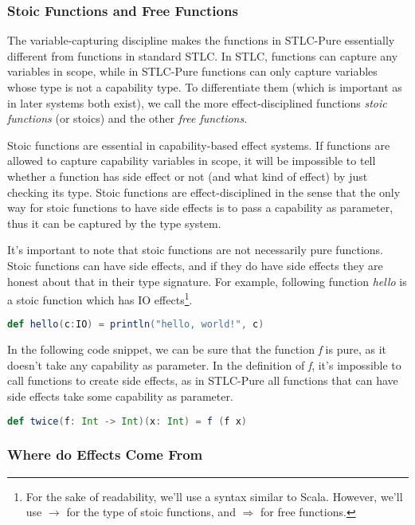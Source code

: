 \subsubsection{Stoic Functions and Free Functions}

The variable-capturing discipline makes the functions in STLC-Pure
essentially different from functions in standard STLC. In STLC,
functions can capture any variables in scope, while in STLC-Pure
functions can only capture variables whose type is not a capability
type. To differentiate them (which is important as in later systems
both exist), we call the more effect-disciplined functions \emph{stoic
  functions} (or stoics) and the other \emph{free functions}.

Stoic functions are essential in capability-based effect systems. If
functions are allowed to capture capability variables in scope, it
will be impossible to tell whether a function has side effect or not
(and what kind of effect) by just checking its type. Stoic functions
are effect-disciplined in the sense that the only way for stoic
functions to have side effects is to pass a capability as parameter,
thus it can be captured by the type system.

It's important to note that stoic functions are not necessarily pure
functions. Stoic functions can have side effects, and if they do have
side effects they are honest about that in their type signature. For
example, following function \emph{hello} is a stoic function which has
IO effects\footnote{For the sake of readability, we'll use a syntax
  similar to Scala. However, we'll use $\to$ for the type of stoic
  functions, and $\Rightarrow$ for free functions.}.

\begin{lstlisting}[language=Scala]
  def hello(c:IO) = println("hello, world!", c)
\end{lstlisting}

In the following code snippet, we can be sure that the function
\emph{f} is pure, as it doesn't take any capability as parameter. In
the definition of \emph{f}, it's impossible to call functions to
create side effects, as in STLC-Pure all functions that can have side
effects take some capability as parameter.

\begin{lstlisting}[language=Scala]
  def twice(f: Int -> Int)(x: Int) = f (f x)
\end{lstlisting}

\subsubsection{Where do Effects Come From}

